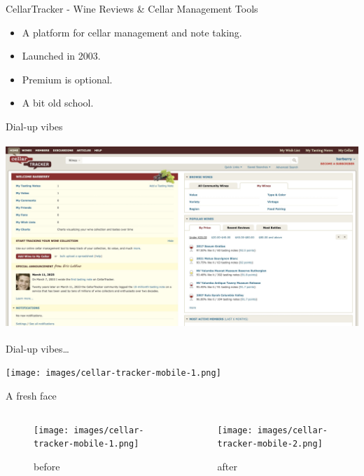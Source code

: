 \documentclass[presentation,aspectratio=169,smaller]{beamer}
\begin{document}
\begin{frame}[label={sec:org8cbbd75}]{CellarTracker - Wine Reviews \& Cellar Management Tools}
\begin{itemize}
\item A platform for cellar management and note taking.
\item Launched in 2003.
\item Premium is optional.
\item A bit old school.
\end{itemize}
\end{frame}
\begin{frame}[label={sec:orgc743fd7}]{Dial-up vibes}
\begin{center}
\includegraphics[height=7.0cm]{images/cellar-tracker-home-desktop.jpeg}
\end{center}
\end{frame}
\begin{frame}[label={sec:org4e85506}]{Dial-up vibes\ldots{}}
\begin{center}
\texttt{[image: images/cellar-tracker-mobile-1.png]}
\end{center}
\end{frame}
\begin{frame}[label={sec:org65884ca}]{A fresh face}
\begin{columns}
\begin{column}{0.5\columnwidth}
\begin{figure}[htbp]
\centering
\texttt{[image: images/cellar-tracker-mobile-1.png]}
\caption{before}
\end{figure}
\end{column}
\begin{column}{0.5\columnwidth}
\begin{figure}[htbp]
\centering
\texttt{[image: images/cellar-tracker-mobile-2.png]}
\caption{after}
\end{figure}
\end{column}
\end{columns}
\end{frame}
\end{document}
